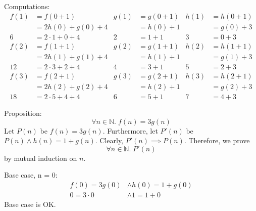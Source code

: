 \documentclass{article}
\begin{document}
\newpage

\section{}
Computations:
\begin{align*}
f(1) &= f(0+1) &g(1) &= g(0+1) &h(1) &= h(0+1) \\
&= 2h(0) + g(0) + 4 &&= h(0) + 1 &&= g(0) + 3 \\
6&= 2 \cdot 1 + 0 + 4 &2&= 1 + 1 &3&= 0 + 3
\end{align*}
\begin{align*}
f(2) &= f(1+1) &g(2) &= g(1+1) &h(2) &= h(1+1) \\
&= 2h(1) + g(1) + 4 &&= h(1) + 1 &&= g(1) + 3 \\
12&= 2 \cdot 3 + 2 + 4 &4&= 3 + 1 &5&= 2 + 3
\end{align*}
\begin{align*}
f(3) &= f(2+1) &g(3) &= g(2+1) &h(3) &= h(2+1) \\
&= 2h(2) + g(2) + 4 &&= h(2) + 1 &&= g(2) + 3 \\
18&= 2 \cdot 5 + 4 + 4 &6&= 5 + 1 &7&= 4 + 3
\end{align*}

Proposition:
\begin{equation}
\forall n \in \mathbb{N}.\;f(n) = 3g(n)
\end{equation}
Let $P(n)$ be $f(n) = 3g(n)$. Furthermore, let $P'(n)$ be $P(n) \land h(n) = 1 + g(n)$. Clearly, $P'(n) \implies P(n)$. Therefore, we prove
\[\forall n \in \mathbb{N}.\;P'(n)\]
by mutual induction on $n$.

Base case, n = 0:
\begin{align*}
f(0) = 3g(0) &\land h(0) = 1 + g(0) \\
0 = 3\cdot 0 &\land 1 = 1 + 0
\end{align*}
Base case is OK.
\end{document}
